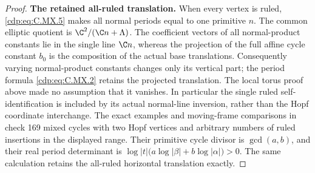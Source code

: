 \begin{proof}
\par\medskip\noindent\textbf{The retained all-ruled translation.}
When every vertex is ruled, \eqref{cdp:eq:C.MX.5}
makes all normal periods equal to
one primitive $n$. The common
elliptic quotient is
$\C^2/(\C n+\Lambda)$. The coefficient
vectors of all normal-product constants
lie in the single line $\C n$,
whereas the projection of the full
affine cycle constant $b_0$ is the
composition of the actual base
translations. Consequently varying
normal-product constants changes
only its vertical part; the period
formula \eqref{cdp:eq:C.MX.2} retains the projected
translation. The local torus proof
above made no assumption that it
vanishes. In particular the
single ruled self-identification
is included by its actual
normal-line inversion, rather than
the Hopf coordinate interchange.
The exact examples and moving-frame comparisons in
check 169 mixed cycles with two Hopf vertices and
arbitrary numbers of ruled insertions in the
displayed range. Their primitive cycle divisor is
$\gcd(a,b)$, and their real period determinant is
$\log|t|\bigl(a\log|\beta|+b\log|\alpha|\bigr)>0$.
The same calculation retains the all-ruled
horizontal translation exactly.
\end{proof}


